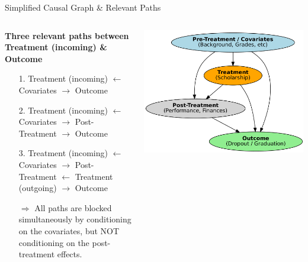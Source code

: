 \documentclass[aspectratio=169]{beamer}
\begin{document}
\begin{frame}{Simplified Causal Graph \& Relevant Paths}
	 \begin{columns}
	\begin{column}{0.58\textwidth}

\textbf{Three relevant paths between \\ Treatment (incoming) \& Outcome}
\small{
\begin{itemize}
    \item [1.] Treatment (incoming) $\leftarrow$ Covariates $\rightarrow$ Outcome
    \item [2.] Treatment (incoming) $\leftarrow$ Covariates $\rightarrow$ Post-Treatment $\rightarrow$ Outcome
    \item [3.] Treatment (incoming) $\leftarrow$ Covariates $\rightarrow$ Post-Treatment $\leftarrow$ Treatment (outgoing) $\rightarrow$ Outcome
\end{itemize}}
\begin{itemize}
	\item [$\Rightarrow$] All paths are blocked simultaneously by conditioning on the covariates, but NOT conditioning on the post-treatment effects.
\end{itemize}
  \end{column}

	\begin{column}{0.45\textwidth}
	\hspace*{-0.5cm}
    \includegraphics[width=1.1\textwidth]{Tex_Pictures/DAG_simple.png}

	\end{column}

\end{columns}
\end{frame}
\end{document}
